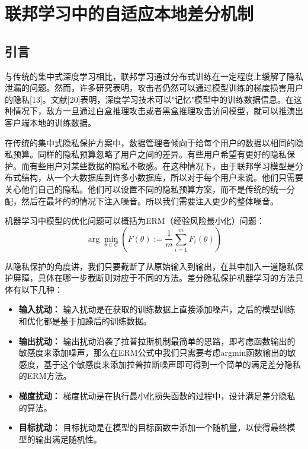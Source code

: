 \chapter{联邦学习中的自适应本地差分机制}

\label{ch3}

\section{引言}
与传统的集中式深度学习相比，联邦学习通过分布式训练在一定程度上缓解了隐私泄漏的问题。然而，许多研究表明，攻击者仍然可以通过模型训练的梯度损害用户的隐私[13]。文献[20]表明，深度学习技术可以"记忆"模型中的训练数据信息。在这种情况下，敌方一旦通过白盒推理攻击或者黑盒推理攻击访问模型，就可以推演出客户端本地的训练数据。

在传统的集中式隐私保护方案中，数据管理者倾向于给每个用户的数据以相同的隐私预算。同样的隐私预算忽略了用户之间的差异。有些用户希望有更好的隐私保护。而有些用户对某些数据的隐私不敏感。在这种情况下，由于联邦学习模型是分布式结构，从一个大数据库到许多小数据库，所以对于每个用户来说。他们只需要关心他们自己的隐私。他们可以设置不同的隐私预算方案，而不是传统的统一分配，然后在最坏的的情况下注入噪音。所以我们需要注入更少的整体噪音。

机器学习中模型的优化问题可以概括为ERM（经验风险最小化）问题：
\begin{equation}\label{eq:ERM}
\arg \min _{\theta \in \mathcal{C}}\left(F(\theta):=\frac{1}{m} \sum_{i=1}^{m} F_{i}(\theta)\right)
\end{equation}

从隐私保护的角度讲，我们只要截断了从原始输入到输出，在其中加入一道隐私保护屏障，具体在哪一步截断则对应于不同的方法。差分隐私保护机器学习的方法具体有以下几种：
\begin{itemize}
	\item \textbf{输入扰动：} 输入扰动是在获取的训练数据上直接添加噪声，之后的模型训练和优化都是基于加躁后的训练数据。
	\item \textbf{输出扰动：} 输出扰动沿袭了拉普拉斯机制最简单的思路，即考虑函数输出的敏感度来添加噪声，那么在ERM公式中我们只需要考虑argmin函数输出的敏感度，基于这个敏感度来添加拉普拉斯噪声即可得到一个简单的满足差分隐私的ERM方法。
	\item \textbf{梯度扰动：} 梯度扰动是在执行最小化损失函数的过程中，设计满足差分隐私的算法。
	\item \textbf{目标扰动：} 目标扰动是在模型的目标函数中添加一个随机量，以使得最终模型的输出满足随机性。
\end{itemize}

